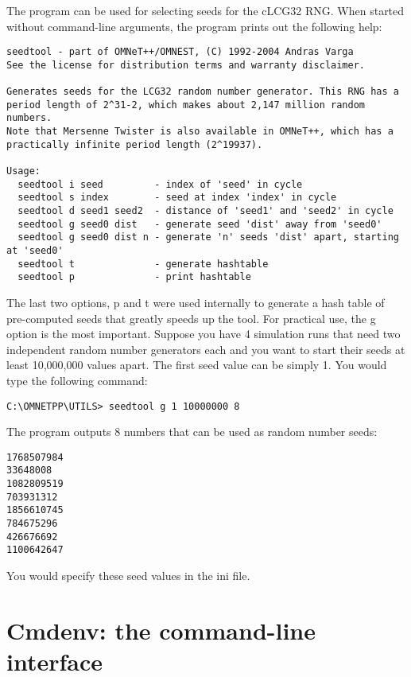 The  program can be used for selecting
seeds for the cLCG32 RNG. When started without command-line
arguments, the program prints out the following help:

\begin{verbatim}
seedtool - part of OMNeT++/OMNEST, (C) 1992-2004 Andras Varga
See the license for distribution terms and warranty disclaimer.

Generates seeds for the LCG32 random number generator. This RNG has a
period length of 2^31-2, which makes about 2,147 million random numbers.
Note that Mersenne Twister is also available in OMNeT++, which has a
practically infinite period length (2^19937).

Usage:
  seedtool i seed         - index of 'seed' in cycle
  seedtool s index        - seed at index 'index' in cycle
  seedtool d seed1 seed2  - distance of 'seed1' and 'seed2' in cycle
  seedtool g seed0 dist   - generate seed 'dist' away from 'seed0'
  seedtool g seed0 dist n - generate 'n' seeds 'dist' apart, starting at 'seed0'
  seedtool t              - generate hashtable
  seedtool p              - print hashtable
\end{verbatim}


The last two options, p and t were used internally to generate
a hash table of pre-computed seeds that greatly speeds up the
tool. For practical use, the g option is the most important.
Suppose you have 4 simulation runs that need two independent
random number generators each and you want to start their seeds
at least 10,000,000 values apart. The first seed value can be
simply 1. You would type the following command:

\begin{verbatim}
C:\OMNETPP\UTILS> seedtool g 1 10000000 8
\end{verbatim}


The program outputs 8 numbers that can be used as random number
seeds:

\begin{verbatim}
1768507984
33648008
1082809519
703931312
1856610745
784675296
426676692
1100642647
\end{verbatim}


You would specify these seed values in the ini file.



\section{Cmdenv: the command-line interface}


